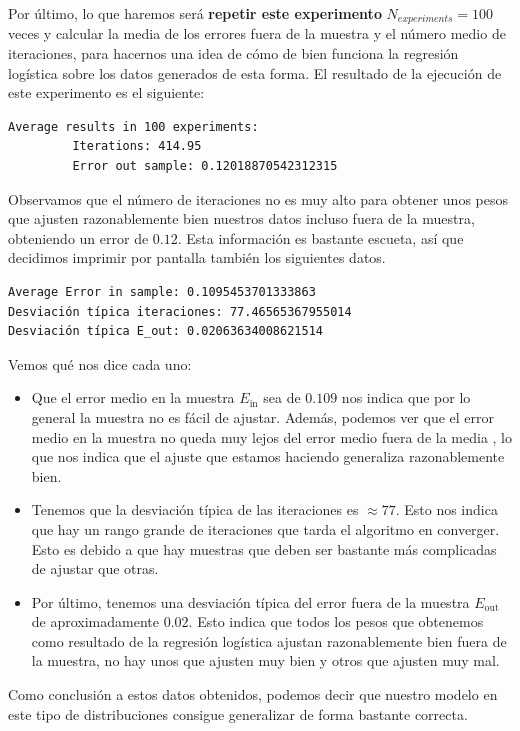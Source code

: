 \documentclass[12pt]{article}
\begin{document}
{Por último, lo que haremos será \textbf{repetir este experimento} $N_{experiments} = 100$ veces y calcular la media de los errores fuera de la muestra y el número medio de iteraciones, para hacernos una idea de cómo de bien funciona la regresión logística sobre los datos generados de esta forma. El resultado de la ejecución de este experimento es el siguiente:
\begin{lstlisting}[language=bash]
  Average results in 100 experiments:
         Iterations: 414.95
         Error out sample: 0.12018870542312315
\end{lstlisting}

\newpage
Observamos que el número de iteraciones no es muy alto para obtener unos pesos que ajusten razonablemente bien nuestros datos incluso fuera de la muestra, obteniendo un error de $0.12$. Esta información es bastante escueta, así que decidimos imprimir por pantalla también los siguientes datos.

\begin{lstlisting}
Average Error in sample: 0.1095453701333863
Desviación típica iteraciones: 77.46565367955014
Desviación típica E_out: 0.02063634008621514
\end{lstlisting}

Vemos qué nos dice cada uno:
\begin{itemize}
  \item Que el error medio en la muestra $E_{\operatorname{in}}$ sea de $0.109$ nos indica que por lo general la muestra no es fácil de ajustar. Además, podemos ver que el error medio en la muestra no queda muy lejos del error medio fuera de la media , lo que nos indica que el ajuste que estamos haciendo generaliza razonablemente bien.
  
  \item Tenemos que la desviación típica de las iteraciones es $\approx 77$. Esto nos indica que hay un rango grande de iteraciones que tarda el algoritmo en converger. Esto es debido a que hay muestras que deben ser bastante más complicadas de ajustar que otras.
  \item Por último, tenemos una desviación típica del error fuera de la muestra $E_{\operatorname{out}} $ de aproximadamente $0.02$. Esto indica que todos los pesos que obtenemos como resultado de la regresión logística ajustan razonablemente bien fuera de la muestra, no hay unos que ajusten muy bien y otros que ajusten muy mal.
\end{itemize}

Como conclusión a estos datos obtenidos, podemos decir que nuestro modelo en este tipo de distribuciones consigue generalizar de forma bastante correcta.

}
\end{document}
